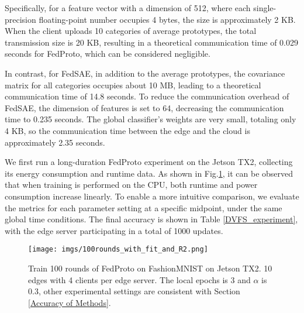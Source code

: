 \documentclass[journal]{IEEEtran}
\begin{document}
Specifically, for a feature vector with a dimension of 512, where each single-precision floating-point number occupies 4 bytes, the size is approximately 2 KB. When the client uploads 10 categories of average prototypes, the total transmission size is 20 KB, resulting in a theoretical communication time of 0.029 seconds for FedProto, which can be considered negligible. 

In contrast, for FedSAE, in addition to the average prototypes, the covariance matrix for all categories occupies about 10 MB, leading to a theoretical communication time of 14.8 seconds. To reduce the communication overhead of FedSAE, the dimension of features is set to 64, decreasing the communication time to 0.235 seconds. The global classifier's weights are very small, totaling only 4 KB, so the communication time between the edge and the cloud is approximately 2.35 seconds.

We first run a long-duration FedProto experiment on the Jetson TX2, collecting its energy consumption and runtime data. As shown in Fig.\ref{100rounds_with_fit_and_R2}, it can be observed that when training is performed on the CPU, both runtime and power consumption increase linearly. To enable a more intuitive comparison, we evaluate the metrics for each parameter setting at a specific midpoint, under the same global time conditions. The final accuracy is shown in Table \ref{DVFS_experiment}, with the edge server participating in a total of 1000 updates.

\begin{figure}
  \centering
  \texttt{[image: imgs/100rounds\_with\_fit\_and\_R2.png]}
  \caption{Train 100 rounds of FedProto on FashionMNIST on Jetson TX2. 10 edges with 4 clients per edge server. The local epochs is 3 and $\alpha$ is 0.3, other experimental settings are consistent with Section \ref{Accuracy of Methods}.}
  \label{100rounds_with_fit_and_R2}
\end{figure}
\end{document}
